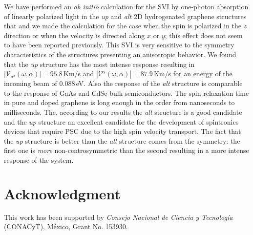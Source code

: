 \documentclass[prb,11pt,tightenlines,twocolumn,aps]{revtex4-1}
\begin{document}
We have performed an \emph{ab initio} calculation for the SVI by one-photon
absorption of linearly polarized light in the \emph{up} and \emph{alt} 2D
hydrogenated graphene structures that and we made the calculation for the case
when the spin is polarized in the $z$ direction or when the velocity is
directed along $x$ or $y$; this effect does not seem to have been reported
previously. 
% 
This SVI is very sensitive to the symmetry characteristics of the structures
presenting an anisotropic behavior. We found that the \emph{up} structure has
the most intense response resulting in $|\mathcal{V}_{\sigma^{\mathrm{z}}}
(\omega,\alpha)| = 95.8$\,Km/s and $|\mathcal{V}^{\mathrm{y}} (\omega,\alpha)|
= 87.9$\,Km/s for an energy of the incoming beam of 0.088\,eV. Also the
response of the \emph{alt} structure is comparable to the response of GaAs and
CdSe bulk semiconductors.
% 
The spin relaxation time in pure and doped graphene is long enough in the order
from nanoseconds to milliseconds. \cite{wojtaszekPRB13,ertlerPRB09} The,
according to our results the \emph{alt} structure is a good candidate and the
\emph{up} structure an excellent candidate for the development of spintronics
devices that require PSC due to the high spin velocity transport. The fact that
the \emph{up} structure is better than the \emph{alt} structure comes from the
symmetry: the first one is \emph{more} non-centrosymmetric than
the second resulting in a more intense response of the system. 

\section{Acknowledgment} %

This work has been supported by \emph{Consejo Nacional de Ciencia y
Tecnolog\'ia} (CONACyT), M\'exico, Grant No. 153930.


\end{document}
